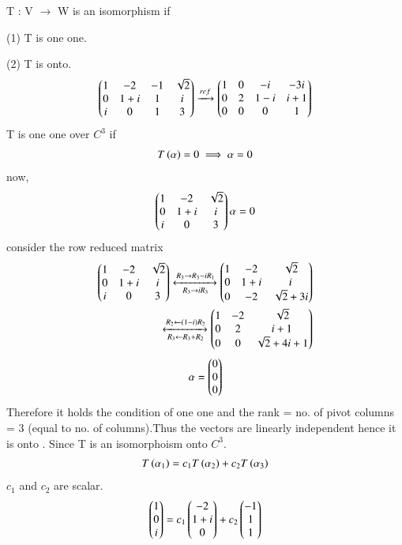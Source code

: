 T : V $\rightarrow$ W is an isomorphism if
 
 (1) T is one one.
 
 (2) T is onto.
\begin{align}
\begin{pmatrix}1&-2&-1&\sqrt{2}\\0&1+i&1&i\\i&0&1&3\end{pmatrix}\xrightarrow[]{ref}\begin{pmatrix}1&0&-i&-3i\\0&2&1-i&i+1\\0&0&0&1\end{pmatrix}
\end{align}
T is one one over $C^{3}$ if 
\begin{align}
    T\left(\alpha\right)=0 \implies \alpha =0
\end{align}
now,
\begin{align}
 \begin{pmatrix}1&-2&\sqrt{2}\\0&1+i&i\\i&0&3\end{pmatrix}\alpha = 0
\end{align}
consider the row reduced matrix
\begin{align}
    \begin{pmatrix}1&-2&\sqrt{2}\\0&1+i&i\\i&0&3\end{pmatrix}
    \xleftrightarrow[R_3\rightarrow i R_3]{R_3\rightarrow R_3-iR_1}\begin{pmatrix}1&-2&\sqrt{2}\\0&1+i&i\\0&-2&\sqrt{2}+3i\end{pmatrix}\\
    \xleftrightarrow[R_3\leftarrow R_3+R_2]{R_2\leftarrow (1-i)R_2}\begin{pmatrix}1&-2&\sqrt{2}\\0&2&i+1\\0&0&\sqrt{2}+4i+1\end{pmatrix}
\end{align}
\begin{align}
    \mathbf{\alpha} = \begin{pmatrix}0\\0\\0\end{pmatrix}
\end{align}
Therefore it holds the condition of one one and the rank = no. of pivot columns = 3 (equal to no. of columns).Thus the  vectors are linearly independent hence it is onto . Since T is an isomorphoism onto $C^{3}$. 
  \begin{align}
  T\left(\alpha_1\right) = c_1T\left(\alpha_2\right)+c_2T\left(\alpha_3\right)\label{eq:solutions/3/3/2/a/pr}  
\end{align}
$c_1$ and $c_2$ are scalar.
\begin{align}
 \begin{pmatrix}1\\0\\i\end{pmatrix}=c{_1}\begin{pmatrix}-2\\1+i\\0\end{pmatrix}+c{_2}\begin{pmatrix}-1\\1\\1\end{pmatrix}
\end{align}

